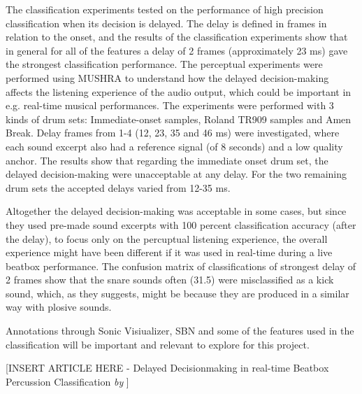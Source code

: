 The classification experiments tested on the performance of high precision classification when its decision is delayed.
The delay is defined in frames in relation to the onset, and the results of the classification experiments show that in general for all of the features a delay of 2 frames (approximately 23 ms) gave the strongest classification performance.
The perceptual experiments were performed using MUSHRA to understand how the delayed decision-making affects the listening experience of the audio output, which could be important in e.g. real-time musical performances. The experiments were performed with 3 kinds of drum sets: Immediate-onset samples, Roland TR909 samples and Amen Break. Delay frames from 1-4 (12, 23, 35 and 46 ms) were investigated, where each sound excerpt also had a reference signal (of 8 seconds) and a low quality anchor. The results show that regarding the immediate onset drum set, the delayed decision-making were unacceptable at any delay. For the two remaining drum sets the accepted delays varied from 12-35 ms.

Altogether the delayed decision-making was acceptable in some cases, but since they used pre-made sound excerpts with 100 percent classification accuracy (after the delay), to focus only on the percuptual listening experience, the overall experience might have been different if it was used in real-time during a live beatbox performance. 
The confusion matrix of classifications of strongest delay of 2 frames show that the snare sounds often (31.5) were misclassified as a kick sound, which, as they suggests, might be because they are produced in a similar way with plosive sounds.

Annotations through Sonic Visiualizer, SBN and some of the features used in the classification will be important and relevant to explore for this project.

[INSERT ARTICLE HERE - Delayed Decisionmaking in real-time Beatbox Percussion Classification \textit{by} \citep{Stowell2010} ]
